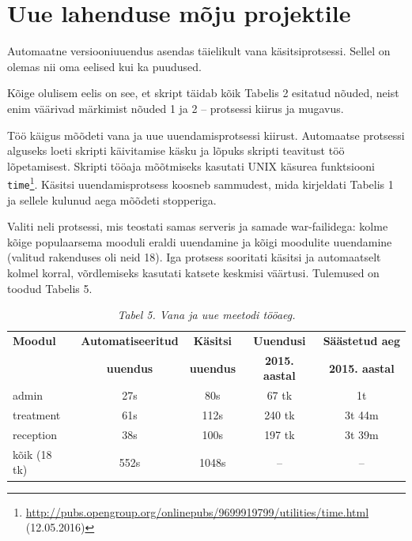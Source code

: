\documentclass[12pt]{article}
\newcommand{\code}[1]{\texttt{#1}}
\begin{document}
  \newpage
  
  \section{Uue lahenduse mõju projektile}
  
  Automaatne versiooniuuendus asendas täielikult vana käsitsiprotsessi. Sellel on olemas nii oma eelised kui ka puudused.
  
  Kõige olulisem eelis on see, et skript täidab kõik Tabelis 2 esitatud nõuded, neist enim väärivad märkimist nõuded 1 ja 2 \--- protsessi kiirus ja mugavus.
  
  Töö käigus mõõdeti vana ja uue uuendamisprotsessi kiirust. Automaatse protsessi alguseks loeti skripti käivitamise käsku ja lõpuks skripti teavitust töö lõpetami\-sest. Skripti tööaja mõõtmiseks kasutati UNIX käsurea funktsiooni \code{time}\footnote{\url{http://pubs.opengroup.org/onlinepubs/9699919799/utilities/time.html} (12.05.2016)}. Käsitsi uuendamisprotsess koosneb sammudest, mida kirjeldati Tabelis 1 ja sellele kulunud aega mõõdeti stopperiga.
  
  Valiti neli protsessi, mis teostati samas serveris ja samade war\--failidega: kolme kõige populaarsema mooduli eraldi uuendamine ja kõigi moodulite uuendamine (valitud rakenduses oli neid 18). Iga protsess sooritati käsitsi ja automaatselt kolmel korral, võrdlemiseks kasutati katsete keskmisi väärtusi. Tulemused on toodud Tabelis 5.
  
  \begin{table}[!htbp]
    \begin{center}
      \caption*{\textit{Tabel 5. Vana ja uue meetodi tööaeg.}}
      
      \begin{tabular}{| l | c | c | c | c |}
        \hline
         \textbf{Moodul} & \textbf{Automatiseeritud} & \textbf{Käsitsi} & \textbf{Uuendusi} & \textbf{Säästetud aeg}\\
         \textbf{} & \textbf{uuendus} & \textbf{uuendus} & \textbf{2015. aastal} & \textbf{2015. aastal}\\
        \hline
        admin & 27s & 80s & 67 tk & 1t\\
        treatment & 61s & 112s & 240 tk & 3t 44m\\
        reception & 38s & 100s & 197 tk & 3t 39m \\
        kõik (18 tk) & 552s & 1048s & \--- & \---\\
        \hline
      \end{tabular}
    \end{center}
  \end{table}
  
\end{document}
